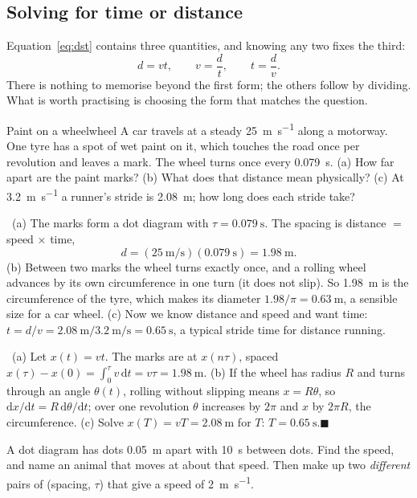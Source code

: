 \documentclass[11pt,twoside,openany]{book}
\newcommand{\dd}{\mathrm{d}}
\newcounter{check}[chapter]
\newcommand{\viewtag}[3]{\fcolorbox{#2}{#3}{\footnotesize\textbf{\textcolor{#2}{#1}}}}
\newcommand{\elemtag}{\viewtag{Elementary}{elemcol}{elempale}}
\newcommand{\calctag}{\viewtag{Calculus}{calccol}{calcpale}}
\newcommand{\elem}{\par\medskip\noindent\elemtag\ }
\newcommand{\calc}{\par\medskip\noindent\calctag\ }
\newcommand{\qed}{\hfill$\blacksquare$}
\begin{document}
\subsection{Solving for time or distance}

Equation~\eqref{eq:dst} contains three quantities, and knowing any two fixes the third:
\[
d = vt, \qquad v = \frac{d}{t}, \qquad t = \frac{d}{v}.
\]
There is nothing to memorise beyond the first form; the others follow by dividing. What is worth practising is choosing the form that matches the question.

\begin{example}{Paint on a wheel}{wheel}
A car travels at a steady \SI{25}{\metre\per\second} along a motorway. One tyre has a spot of wet paint on it, which touches the road once per revolution and leaves a mark. The wheel turns once every \SI{0.079}{\second}. (a) How far apart are the paint marks? (b) What does that distance mean physically? (c) At \SI{3.2}{\metre\per\second} a runner's stride is \SI{2.08}{\metre}; how long does each stride take?

\elem (a) The marks form a dot diagram with $\tau = \SI{0.079}{\second}$. The spacing is distance $= $ speed $\times$ time,
\[
d = (\SI{25}{\metre\per\second})(\SI{0.079}{\second}) = \SI{1.98}{\metre}.
\]
(b) Between two marks the wheel turns exactly once, and a rolling wheel advances by its own circumference in one turn (it does not slip). So \SI{1.98}{\metre} is the circumference of the tyre, which makes its diameter $1.98/\pi = \SI{0.63}{\metre}$, a sensible size for a car wheel. (c) Now we know distance and speed and want time: $t = d/v = \SI{2.08}{\metre}/\SI{3.2}{\metre\per\second} = \SI{0.65}{\second}$, a typical stride time for distance running.

\calc (a) Let $x(t) = vt$. The marks are at $x(n\tau)$, spaced $x(\tau) - x(0) = \int_0^{\tau} v\,\dd t = v\tau = \SI{1.98}{\metre}$. (b) If the wheel has radius $R$ and turns through an angle $\theta(t)$, rolling without slipping means $x = R\theta$, so $\dd x/\dd t = R\,\dd\theta/\dd t$; over one revolution $\theta$ increases by $2\pi$ and $x$ by $2\pi R$, the circumference. (c) Solve $x(T) = vT = \SI{2.08}{\metre}$ for $T$: $T = \SI{0.65}{\second}$.\qed
\end{example}

\begin{checkbox}
A dot diagram has dots \SI{0.05}{\metre} apart with \SI{10}{\second} between dots. Find the speed, and name an animal that moves at about that speed. Then make up two \emph{different} pairs of (spacing, $\tau$) that give a speed of \SI{2}{\metre\per\second}.
\end{checkbox}
\end{document}
